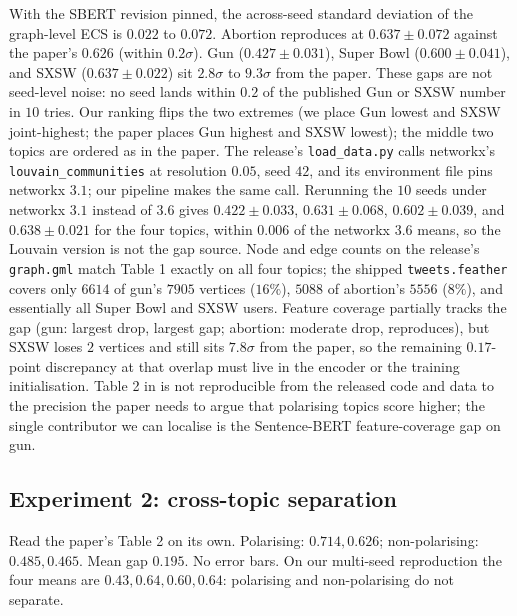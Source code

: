 \documentclass[letterpaper]{article} %
\begin{document}
With the SBERT revision pinned, the across-seed standard
deviation of the graph-level ECS is $0.022$ to $0.072$. Abortion
reproduces at $0.637 \pm 0.072$ against the paper's $0.626$
(within $0.2\sigma$). Gun ($0.427 \pm 0.031$), Super Bowl
($0.600 \pm 0.041$), and SXSW ($0.637 \pm 0.022$) sit
$2.8\sigma$ to $9.3\sigma$ from the paper. These gaps are not
seed-level noise: no seed lands within $0.2$ of the published
Gun or SXSW number in $10$ tries. Our ranking flips the two
extremes (we place Gun lowest and SXSW joint-highest; the paper
places Gun highest and SXSW lowest); the middle two topics are
ordered as in the paper. The release's \texttt{load\_data.py}
calls networkx's \texttt{louvain\_communities} at resolution
$0.05$, seed $42$, and its environment file pins networkx
$3.1$; our pipeline makes the same call. Rerunning the $10$
seeds under networkx $3.1$ instead of $3.6$ gives $0.422 \pm
0.033$, $0.631 \pm 0.068$, $0.602 \pm 0.039$, and $0.638 \pm
0.021$ for the four topics, within $0.006$ of the networkx
$3.6$ means, so the Louvain version is not the gap source. Node and edge counts on the release's \texttt{graph.gml}
match Table 1 exactly on all four topics; the shipped
\texttt{tweets.feather} covers only $6614$ of gun's $7905$
vertices ($16\%$), $5088$ of abortion's $5556$ ($8\%$), and
essentially all Super Bowl and SXSW users. Feature coverage
partially tracks the gap (gun: largest drop, largest gap;
abortion: moderate drop, reproduces), but SXSW loses $2$
vertices and still sits $7.8\sigma$ from the paper, so the
remaining $0.17$-point discrepancy at that overlap must live
in the encoder or the training initialisation. Table 2 in
\citet{Alatawi23EchoGAE} is not reproducible from the
released code and data to the precision the paper needs to
argue that polarising topics score higher; the single
contributor we can localise is the Sentence-BERT
feature-coverage gap on gun.

\subsection{Experiment 2: cross-topic separation}\label{sec:exp-cross}

Read the paper's Table 2 on its own. Polarising: $0.714, 0.626$;
non-polarising: $0.485, 0.465$. Mean gap $0.195$. No error bars.
On our multi-seed reproduction the four means are $0.43, 0.64,
0.60, 0.64$: polarising and non-polarising do not separate.
\end{document}
